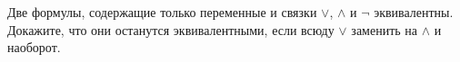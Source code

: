 Две формулы, содержащие только переменные и связки $\lor$, $\land$ и $\lnot$ эквивалентны. Докажите, что они останутся
эквивалентными, если всюду $\lor$ заменить на $\land$ и наоборот.